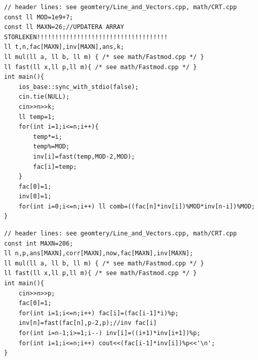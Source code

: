 
\begin{lstlisting}[breaklines=true]
// header lines: see geomtery/Line_and_Vectors.cpp, math/CRT.cpp
const ll MOD=1e9+7;
const ll MAXN=26;//UPDATERA ARRAY STORLEKEN!!!!!!!!!!!!!!!!!!!!!!!!!!!!!!!!!!!!
ll t,n,fac[MAXN],inv[MAXN],ans,k;
ll mul(ll a, ll b, ll m) { /* see math/Fastmod.cpp */ }
ll fast(ll x,ll p,ll m){ /* see math/Fastmod.cpp */ }
int main(){
    ios_base::sync_with_stdio(false);
    cin.tie(NULL);
    cin>>n>>k;
    ll temp=1;
    for(int i=1;i<=n;i++){
        temp*=i;
        temp%=MOD;
        inv[i]=fast(temp,MOD-2,MOD);
        fac[i]=temp;
    }
    fac[0]=1;
    inv[0]=1;
    for(int i=0;i<=n;i++) ll comb=((fac[n]*inv[i])%MOD*inv[n-i])%MOD;
}
\end{lstlisting}


\begin{lstlisting}[breaklines=true]
// header lines: see geomtery/Line_and_Vectors.cpp, math/CRT.cpp
const int MAXN=206;
ll n,p,ans[MAXN],corr[MAXN],now,fac[MAXN],inv[MAXN];
ll mul(ll a, ll b, ll m) { /* see math/Fastmod.cpp */ }
ll fast(ll x,ll p,ll m){ /* see math/Fastmod.cpp */ }
int main(){
    cin>>n>>p;
    fac[0]=1;
    for(int i=1;i<=n;i++) fac[i]=(fac[i-1]*i)%p;
    inv[n]=fast(fac[n],p-2,p);//inv fac[i]
    for(int i=n-1;i>=1;i--) inv[i]=((i+1)*inv[i+1])%p;
    for(int i=1;i<=n;i++) cout<<(fac[i-1]*inv[i])%p<<'\n';
}
\end{lstlisting}


